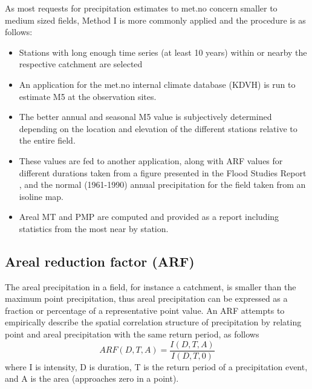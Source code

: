 \documentclass[12pt,a4paper,english]{article}
\begin{document}
As most requests for precipitation estimates to met.no concern smaller to medium sized fields, Method I is more commonly applied and the procedure is as follows:
\begin{itemize}\itemsep-1pt
\item Stations with long enough time series (at least 10 years) within or nearby the respective catchment are selected
\item An application for the met.no internal climate database (KDVH) is run to estimate M5 at the observation sites.  
\item The better annual and seasonal M5 value is subjectively determined depending on the location and elevation of the different stations relative to the entire field. 
\item These values are fed to another application, along with ARF values for different durations taken from a figure presented in the Flood Studies Report \citep{NERC1975}, and the normal (1961-1990) annual precipitation for the field taken from an isoline map. 
\item Areal MT and PMP are computed and provided as a report including statistics from the most near by station.
\end{itemize} 

\subsection{Areal reduction factor (ARF)}

The areal precipitation in a field, for instance a catchment, is smaller than the maximum point precipitation, thus areal precipitation can be expressed as a fraction or percentage of a representative point value. An ARF attempts to empirically describe the spatial correlation structure of precipitation by relating point and areal precipitation with the same return period, as follows
\begin{equation}
ARF(D,T,A) = \frac{I(D,T,A)}{I(D,T,0)}
\end{equation}
where I is intensity, D is duration, T is the return period of a precipitation event, and A is the area (approaches zero in a point).\\
\end{document}

